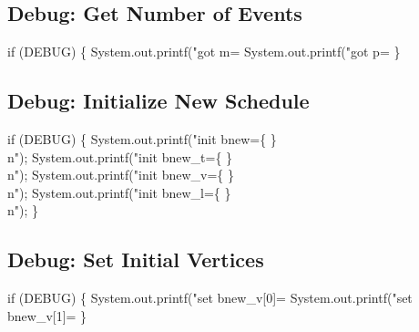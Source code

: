 \subsection{Debug: Get Number of Events}

\nwenddocs{}\endmoddef\nwstartdeflinemarkup{}\nwenddeflinemarkup
if (DEBUG) \{
  System.out.printf("got m=%
  System.out.printf("got p=%
\}
\nwendcode{}\nwdocspar

\subsection{Debug: Initialize New Schedule}

\nwenddocs{}\endmoddef\nwstartdeflinemarkup{}\nwenddeflinemarkup
if (DEBUG) \{
  System.out.printf("init bnew=\{ \}\\n");
  System.out.printf("init bnew_t=\{ \}\\n");
  System.out.printf("init bnew_v=\{ \}\\n");
  System.out.printf("init bnew_l=\{ \}\\n");
\}
\nwendcode{}\nwdocspar

\subsection{Debug: Set Initial Vertices}

\nwenddocs{}\endmoddef\nwstartdeflinemarkup{}\nwenddeflinemarkup
if (DEBUG) \{
  System.out.printf("set bnew_v[0]=%
  System.out.printf("set bnew_v[1]=%
\}
\nwendcode{}\nwdocspar

